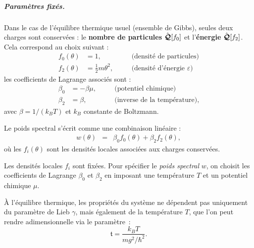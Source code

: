 \subparagraph{Paramètres fixés.}
Dans le cas de l’équilibre thermique usuel (ensemble de Gibbs), seules deux charges sont conservées : le {\bf nombre de particules} \( \hat{\bm{\mathcal{Q}}}[f_0] \) et l’{\bf énergie} \( \hat{\bm{\mathcal{Q}}}[f_2] \). Cela correspond au choix suivant :
\begin{align*}
	f_0(\theta) &= 1, \quad &&\text{(densité de particules)} \\
	f_2(\theta) &= \frac{1}{2}m \theta^2, \quad &&\text{(densité d’énergie $\varepsilon$)}
\end{align*}
les coefficients de Lagrange associés sont :
\begin{align*}
	\beta_0 &= -\beta \mu, \quad &&\text{(potentiel chimique)} \\
	\beta_2 &= \beta, \quad &&\text{(inverse de la température)},
\end{align*}
avec $\beta = 1 / ( k_B T )$ et  $k_B$ constante de Boltzmann.

\medskip

Le poids spectral s’écrit comme une combinaison linéaire :
\begin{eqnarray}\label{chap4:eq.w.1}
	w(\theta) & = & \beta_0 f_0(\theta) + \beta_2 f_2(\theta),
\end{eqnarray}
où les \( f_i(\theta) \) sont les densités locales associées aux charges conservées.



\medskip

Les densités locales $f_i$ sont fixées. Pour spécifier le {\em poids spectral} $w$, on choisit les coefficients de Lagrange $\beta_0$ et $\beta_2$ en imposant une température \(T\) et un potentiel chimique \(\mu\).

\medskip

À l’équilibre thermique, les propriétés du système ne dépendent pas uniquement du paramètre de Lieb $\gamma$, mais également de la température $T$, que l’on peut rendre adimensionnelle via le paramètre :
\begin{equation}\label{chap2:eq:t.1}
\mathfrak{t} = \frac{k_B T}{mg^2/\hbar^2}.
\end{equation}



